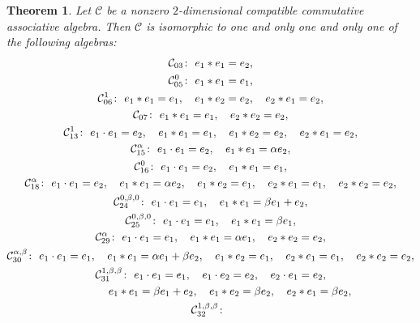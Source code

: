 \documentclass[pdftex]{sigma}
\numberwithin{equation}{section}
\newtheorem{Theorem}{Theorem}[section]
\begin{document}
\begin{Theorem}\label{comasscom2}
Let $\mathcal{C}$ be a nonzero $2$-dimensional compatible commutative associative algebra.
Then $\mathcal{C}$ is isomorphic to one and only one and only one of the following
algebras:
\begin{gather*}
 \mathcal{C}_{03} \colon\ e_{1}\ast e_{1} =e_{2}, \\
 \mathcal{C}_{05}^{0} \colon\ e_{1}\ast e_{1} =e_{1}, \\
 \mathcal{C}_{06}^{1} \colon\ e_{1} \ast e_{1} =e_{1}, \quad e_{1} \ast e_{2} = e_{2}, \quad e_{2} \ast e_{1} =e_{2}, \\
 \mathcal{C}_{07} \colon\ e_{1}\ast e_{1} =e_{1},\quad e_{2}\ast e_{2}=e_{2}, \\
 \mathcal{C}_{13}^{1 } \colon\
 e_{1}\cdot e_{1}=e_{2} , \quad
 e_{1}\ast e_{1}= e_{1} , \quad e_{1}\ast e_{2}=e_{2} , \quad e_{2}\ast
e_{1}= e_{2},
\\
 \mathcal{C}_{15}^{\alpha } \colon\
 e_{1}\cdot e_{1}=e_{2} , \quad
 e_{1}\ast e_{1}=\alpha e_{2}, \\
 \mathcal{C}_{16}^{0 } \colon\
 e_{1}\cdot e_{1}=e_{2} , \quad
 e_{1}\ast e_{1}=e_{1},
\\
 \mathcal{C}_{18}^{\alpha } \colon\
 e_{1}\cdot e_{1}=e_{2} , \quad
 e_{1}\ast e_{1}=\alpha e_{2} , \quad e_{1}\ast e_{2}=e_{1} , \quad e_{2}\ast
e_{1}=e_{1} , \quad e_{2}\ast e_{2}=e_{2},
\\
 \mathcal{C}_{24}^{0 ,\beta ,0 } \colon\
 e_{1}\cdot e_{1}=e_{1} , \quad
 e_{1}\ast e_{1}=\beta e_{1}+e_{2},\\
 \mathcal{C}_{25}^{0 ,\beta ,0 } \colon\
 e_{1}\cdot e_{1}=e_{1} , \quad
 e_{1}\ast e_{1}=\beta e_{1},
\\
 \mathcal{C}_{29}^{\alpha } \colon\
 e_{1}\cdot e_{1}=e_{1} , \quad
 e_{1}\ast e_{1}=\alpha e_{1} , \quad e_{2}\ast e_{2}=e_{2},
 \\
 \mathcal{C}_{30}^{\alpha ,\beta } \colon\
 e_{1}\cdot e_{1}=e_{1} , \quad
 e_{1}\ast e_{1}=\alpha e_{1}+\beta e_{2} , \quad e_{1}\ast e_{2}=e_{1} , \quad
e_{2}\ast e_{1}=e_{1} , \quad e_{2}\ast e_{2}=e_{2},
\\
 \mathcal{C}_{31}^{1 ,\beta ,\beta } \colon\
 e_{1}\cdot e_{1}=e_{1} , \quad e_{1}\cdot e_{2}= e_{2} , \quad e_{2}\cdot
e_{1}=e_{2} , \\
\hphantom{\mathcal{C}_{31}^{1 ,\beta ,\beta } \colon} \
 e_{1}\ast e_{1}=\beta e_{1}+e_{2} ,\quad e_{1}\ast e_{2}=\beta e_{2} , \quad
e_{2}\ast e_{1}=\beta e_{2},
\\
 \mathcal{C}_{32}^{1 ,\beta ,\beta } \colon\

\end{gather*}
\end{Theorem}
\end{document}
